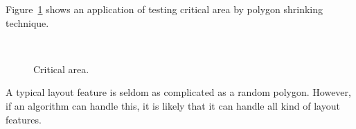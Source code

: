 \documentclass{acm_proc_article-sp}          %
\begin{document}
Figure~\ref{fig:critical_area} shows an application of testing critical area
by polygon shrinking technique.

\begin{figure}[ht]
  \centering
  \\
  \caption{Critical area.}\label{fig:critical_area}
\end{figure}


A typical layout feature is seldom as complicated as a random polygon. 
However, if an algorithm can handle this, it is likely that it can
handle all kind of layout features.  
\end{document}
